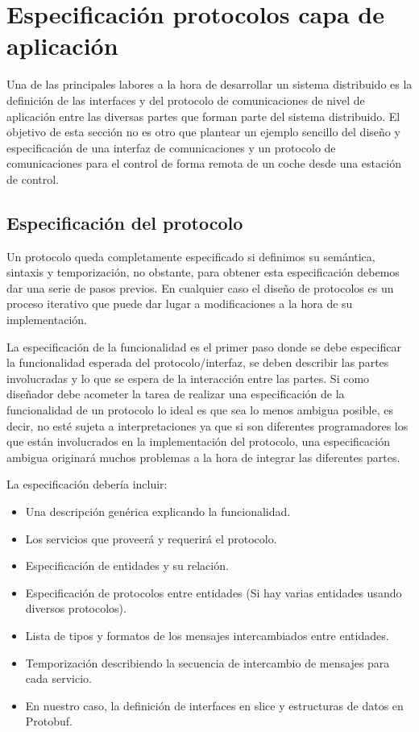 \chapter{Especificación protocolos capa de aplicación}
Una de las principales labores a la hora de desarrollar un sistema
distribuido es la definición de las interfaces y del protocolo de
comunicaciones de nivel de aplicación entre las diversas partes que
forman parte del sistema distribuido. El objetivo de esta sección no
es otro que plantear un ejemplo sencillo del diseño y especificación de
una interfaz de comunicaciones y un protocolo de comunicaciones para el
control de forma remota de un coche desde una estación de control.
\section{Especificación del protocolo}
Un protocolo queda completamente especificado si definimos su
semántica, sintaxis y temporización, no obstante, para obtener
esta especificación debemos dar una serie de pasos previos. En cualquier caso
el diseño de protocolos es un proceso iterativo que puede dar lugar
a modificaciones a la hora de su implementación.

La especificación de la funcionalidad es el primer paso donde se debe
especificar la funcionalidad esperada del protocolo/interfaz, se deben
describir las partes involucradas y lo que se espera de la interacción
entre las partes. Si como diseñador debe acometer la tarea de realizar una
especificación de la funcionalidad de un protocolo lo ideal es que sea lo menos
ambigua posible, es decir, no esté sujeta a interpretaciones ya que si son
diferentes programadores los que están involucrados en la implementación
del protocolo, una especificación ambigua originará muchos problemas a la hora
de integrar las diferentes partes.

La especificación debería incluir:
%
\begin{itemize}
\item Una descripción genérica explicando la funcionalidad.
\item Los servicios que proveerá y requerirá el protocolo.
\item Especificación de entidades y su relación.
\item Especificación de protocolos entre entidades (Si hay varias entidades usando diversos protocolos).
\item Lista de tipos y formatos de los mensajes intercambiados entre entidades.
\item Temporización describiendo la secuencia de intercambio de mensajes para cada servicio.
\item En nuestro caso, la definición de interfaces en slice y estructuras de datos en Protobuf.
\end{itemize}

